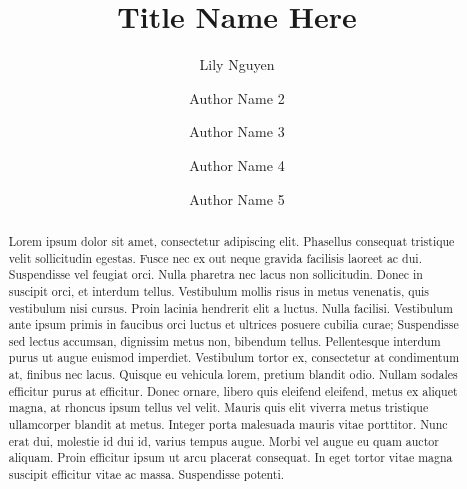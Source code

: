 \documentclass[linenumbers,RNAAS,trackchanges]{aastex631}
\begin{document}
\title{Title Name Here}
\author{Lily Nguyen}

\author[0000-0000-0000-0000]{Author Name 2}


\author[0000-0000-0000-0000]{Author Name 3}
\author[0000-0000-0000-0000]{Author Name 4}
\author[0000-0000-0000-0000]{Author Name 5}

\begin{abstract}
Lorem ipsum dolor sit amet, consectetur adipiscing elit. Phasellus consequat tristique velit sollicitudin egestas. Fusce nec ex out neque gravida facilisis laoreet ac dui. Suspendisse vel feugiat orci. Nulla pharetra nec lacus non sollicitudin. Donec in suscipit orci, et interdum tellus. Vestibulum mollis risus in metus venenatis, quis vestibulum nisi cursus. Proin lacinia hendrerit elit a luctus. Nulla facilisi. Vestibulum ante ipsum primis in faucibus orci luctus et ultrices posuere cubilia curae; Suspendisse sed lectus accumsan, dignissim metus non, bibendum tellus.
Pellentesque interdum purus ut augue euismod imperdiet. Vestibulum tortor ex, consectetur at condimentum at, finibus nec lacus. Quisque eu vehicula lorem, pretium blandit odio. Nullam sodales efficitur purus at efficitur. Donec ornare, libero quis eleifend eleifend, metus ex aliquet magna, at rhoncus ipsum tellus vel velit. Mauris quis elit viverra metus tristique ullamcorper blandit at metus. Integer porta malesuada mauris vitae porttitor. Nunc erat dui, molestie id dui id, varius tempus augue. Morbi vel augue eu quam auctor aliquam. Proin efficitur ipsum ut arcu placerat consequat. In eget tortor vitae magna suscipit efficitur vitae ac massa. Suspendisse potenti.
\end{abstract}

\end{document}
